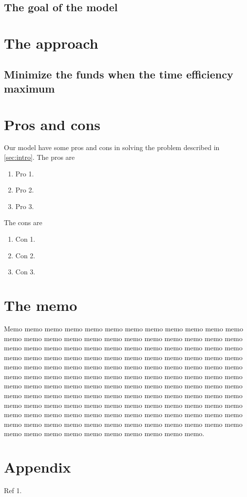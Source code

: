 \documentclass{article}
\begin{document}
\subsection{The goal of the model}


\section{The approach}
\subsection{Minimize the funds when the time efficiency maximum}


\section{Pros and cons}
Our model have some pros and cons in solving the problem described in \ref{sec:intro}.
The pros are
\begin{enumerate}
\item Pro 1.
\item Pro 2.
\item Pro 3.
\end{enumerate}

The cons are
\begin{enumerate}
\item Con 1.
\item Con 2.
\item Con 3.
\end{enumerate}

\newpage

\section{The memo}
\label{sec:memo}

Memo memo memo memo memo memo memo memo memo memo memo memo memo memo memo memo memo memo memo memo memo memo memo memo memo memo memo memo memo memo memo memo memo memo memo memo memo memo memo memo memo memo memo memo memo memo memo memo memo memo memo memo memo memo memo memo memo memo memo memo memo memo memo memo memo memo memo memo memo memo memo memo memo memo memo memo memo memo memo memo memo memo memo memo memo memo memo memo memo memo memo memo memo memo memo memo memo memo memo memo memo memo memo memo memo memo memo memo memo memo memo memo memo memo memo memo memo memo memo memo memo memo memo memo memo memo memo memo memo memo memo memo memo memo memo memo memo memo memo memo memo memo.
\section{Appendix}
\newpage

\begin{thebibliography}{9}
\item Ref 1.
\end{thebibliography}
\end{document}
